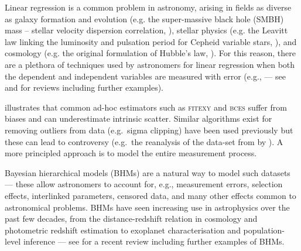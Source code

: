 \documentclass[fleqn,usenatbib]{rasti}
\begin{document}




Linear regression is a common problem in astronomy, arising in fields as diverse
as galaxy formation and evolution (e.g. the super-massive black hole (SMBH) mass
-- stellar velocity dispersion correlation, \citealt{Ferrarese:2000,
Gebhardt:2000}), stellar physics (e.g. the Leavitt law linking the luminosity
and pulsation period for Cepheid variable stars, \citealt{Leavitt:1912}), and
cosmology (e.g. the original formulation of Hubble's law,
\citealt{Hubble:1929}). For this reason, there are a plethora of techniques used
by astronomers for linear regression when both the dependent and independent
variables are measured with error (e.g., \citealt{Press:1992, Akritas:1996,
Tremaine:2002, Kelly:2007} --- see \citealt{Andreon:2013} and \citealt{Andreon:2015}
for reviews including further examples).

\citet{Kelly:2007} illustrates that common ad-hoc estimators such as
\textsc{fitexy} \citep{Press:1992, Tremaine:2002} and \textsc{bces}
\citep{Akritas:1996} suffer from biases and can underestimate intrinsic scatter.
Similar algorithms exist for removing outliers from data (e.g.\ sigma clipping)
have been used previously but these can lead to controversy (e.g.\ the
reanalysis of the data-set from \citealt{Riess:2011} by
\citealt{Efstathiou:2014}). A more principled approach is to model the entire
measurement process.

Bayesian hierarchical models (BHMs) are a natural way to model such datasets ---
these allow astronomers to account for, e.g., measurement errors, selection
effects, interlinked parameters, censored data, and many other effects common to
astronomical problems. BHMs have seen increasing use in astrophysics over the
past few decades, from the distance-redshift relation in cosmology
\citep[e.g.][]{Feeney:2018, Avelino:2019} and photometric redshift estimation
\citep[e.g.][]{Leistedt:2016} to exoplanet characterisation
\citep[e.g.][]{Sestovic:2018} and population-level inference
\citep[e.g.][]{Kelly:2009} --- see \citet{Feigelson:2021} for a recent review
including further examples of BHMs.
\end{document}
